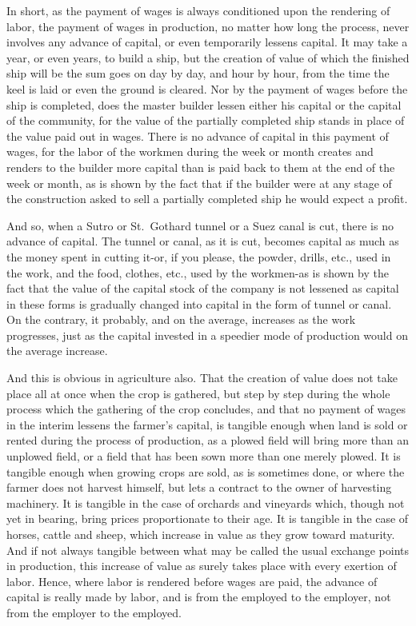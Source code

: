 In short, as the payment of wages is always conditioned upon the
rendering of labor, the payment of wages in production, no matter how
long the process, never involves any advance of capital, or even
temporarily lessens capital. It may take a year, or even years, to build
a ship, but the creation of value of which the finished ship will be the
sum goes on day by day, and hour by hour, from the time the keel is laid
or even the ground is cleared. Nor by the payment of wages before the
ship is completed, does the master builder lessen either his capital or
the capital of the community, for the value of the partially completed
ship stands in place of the value paid out in wages. There is no advance
of capital in this payment of wages, for the labor of the workmen during
the week or month creates and renders to the builder more capital than
is paid back to them at the end of the week or month, as is shown by the
fact that if the builder were at any stage of the construction asked to
sell a partially completed ship he would expect a profit.

And so, when a Sutro or St.~Gothard tunnel or a Suez canal is cut, there
is no advance of capital. The tunnel or canal, as it is cut, becomes
capital as much as the money spent in cutting it-or, if you please, the
powder, drills, etc., used in the work, and the food, clothes, etc.,
used by the workmen-as is shown by the fact that the value of the
capital stock of the company is not lessened as capital in these forms
is gradually changed into capital in the form of tunnel or canal. On the
contrary, it probably, and on the average, increases as the work
progresses, just as the capital invested in a speedier mode of
production would on the average increase.

And this is obvious in agriculture also. That the creation of value does
not take place all at once when the crop is gathered, but step by step
during the whole process which the gathering of the crop concludes, and
that no payment of wages in the interim lessens the farmer's capital, is
tangible enough when land is sold or rented during the process of
production, as a plowed field will bring more than an unplowed field, or
a field that has been sown more than one merely plowed. It is tangible
enough when growing crops are sold, as is sometimes done, or where the
farmer does not harvest himself, but lets a contract to the owner of
harvesting machinery. It is tangible in the case of orchards and
vineyards which, though not yet in bearing, bring prices proportionate
to their age. It is tangible in the case of horses, cattle and sheep,
which increase in value as they grow toward maturity. And if not always
tangible between what may be called the usual exchange points in
production, this increase of value as surely takes place with every
exertion of labor. Hence, where labor is rendered before wages are paid,
the advance of capital is really made by labor, and is from the employed
to the employer, not from the employer to the employed.

